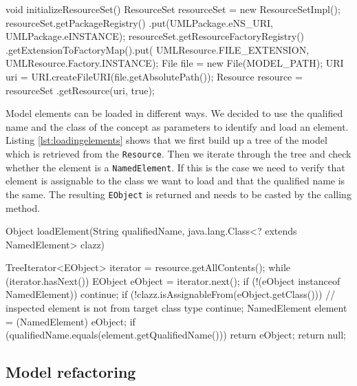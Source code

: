\documentclass{llncs}
\begin{document}
\begin{lstsingle}[language=Java,caption=Initializing the resourceset,label=lst:resourceset]
void initializeResourceSet() {
  ResourceSet resourceSet = new ResourceSetImpl();
  resourceSet.getPackageRegistry()
    .put(UMLPackage.eNS_URI, UMLPackage.eINSTANCE);
  resourceSet.getResourceFactoryRegistry()
    .getExtensionToFactoryMap().put(
      UMLResource.FILE_EXTENSION, 
      UMLResource.Factory.INSTANCE);
  File file = new File(MODEL_PATH);
  URI uri = URI.createFileURI(file.getAbsolutePath());
  Resource resource = resourceSet
    .getResource(uri, true);
}
\end{lstsingle}

Model elements can be loaded in different ways. We decided to use the qualified name and the class of the concept as 
parameters to identify and load an element. Listing \ref{lst:loadingelements} shows that we first build up a tree of 
the model which is retrieved from the \texttt{Resource}. Then we iterate through the tree and check whether the element 
is a \texttt{NamedElement}. If this is the case we need to verify that element is assignable to the class we want to 
load and that the qualified name is the same. The resulting \texttt{EObject} is returned and needs to be casted by the 
calling method.

\begin{lstsingle}[language=Java,caption=Loading elements from the model,label=lst:loadingelements]
Object loadElement(String qualifiedName, 
  java.lang.Class<? extends NamedElement> clazz) {
  
  TreeIterator<EObject> iterator = 
    resource.getAllContents();
  while (iterator.hasNext()) {
    EObject eObject = iterator.next();
    if (!(eObject instanceof NamedElement)) {
      continue;
    }
    if (!clazz.isAssignableFrom(eObject.getClass())) {
      // inspected element is not from target class type
      continue;
    }
    NamedElement element = (NamedElement) eObject;
    if (qualifiedName.equals(element.getQualifiedName())) {
      return eObject;
    }
  }
  return null;
}
\end{lstsingle}

\subsection{Model refactoring}
\end{document}
